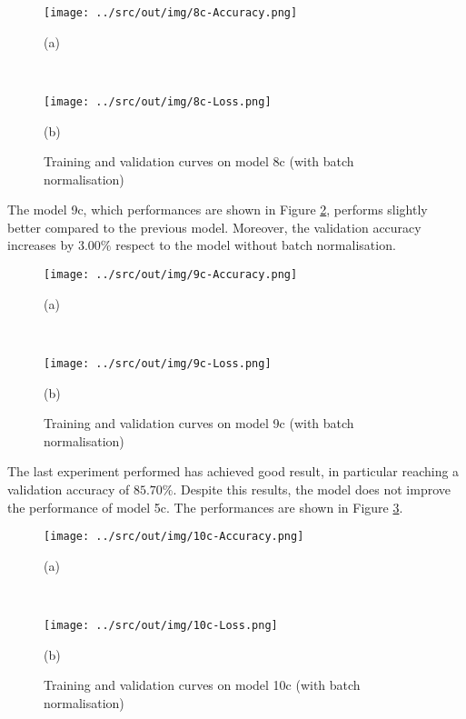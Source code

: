 \documentclass[a4paper,12pt]{article} %
\begin{document}
	\begin{figure}[htb]
		\begin{minipage}[c]{.49\textwidth}
			\centering
			\texttt{[image: ../src/out/img/8c-Accuracy.png]}
			\caption*{(a)}
		\end{minipage}
		~
		\begin{minipage}[c]{.49\textwidth}
			\centering
			\texttt{[image: ../src/out/img/8c-Loss.png]}
			\caption*{(b)}
		\end{minipage}
		\caption{Training and validation curves on model 8c (with batch 
			normalisation)}
		\label{fig:model8c-performance}
	\end{figure}
	
	The model 9c, which performances are shown in Figure 
	\ref{fig:model9c-performance}, performs slightly better compared to the 
	previous model. Moreover, the validation accuracy increases by $3.00\%$ 
	respect to the model without batch normalisation.
		
	\begin{figure}[H]
		\begin{minipage}[c]{.49\textwidth}
			\centering
			\texttt{[image: ../src/out/img/9c-Accuracy.png]}
			\caption*{(a)}
		\end{minipage}
		~
		\begin{minipage}[c]{.49\textwidth}
			\centering
			\texttt{[image: ../src/out/img/9c-Loss.png]}
			\caption*{(b)}
		\end{minipage}
		\caption{Training and validation curves on model 9c (with batch 
			normalisation)}
		\label{fig:model9c-performance}
	\end{figure}
	
	The last experiment performed has achieved good result, in particular 
	reaching a validation accuracy of $85.70\%$. Despite this results, the 
	model does not improve the performance of model 5c.
	The performances are shown in Figure \ref{fig:model10c-performance}.
	\newline
	
	\begin{figure}[htb]
		\begin{minipage}[c]{.49\textwidth}
			\centering
			\texttt{[image: ../src/out/img/10c-Accuracy.png]}
			\caption*{(a)}
		\end{minipage}
		~
		\begin{minipage}[c]{.49\textwidth}
			\centering
			\texttt{[image: ../src/out/img/10c-Loss.png]}
			\caption*{(b)}
		\end{minipage}
		\caption{Training and validation curves on model 10c (with batch 
			normalisation)}
		\label{fig:model10c-performance}
	\end{figure}
\end{document}
